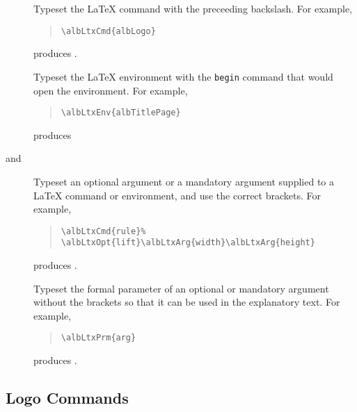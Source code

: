 \documentclass[11pt,a4paper,oneside,titlepage]{alb-latex}
\begin{document}
\begin{description}
\item[] Typeset the \LaTeX{} command
   with the preceeding backslash.  For example,
  \begin{quote}
\begin{verbatim}
\albLtxCmd{albLogo}
\end{verbatim}
  \end{quote}
  produces .

\item[] Typeset the \LaTeX{}
  environment  with the \texttt{begin} command that would
  open the environment.  For example,
  \begin{quote}
\begin{verbatim}
\albLtxEnv{albTitlePage}
\end{verbatim}
  \end{quote}
  produces 

\item[%
   and
  ] Typeset an optional argument  or a mandatory argument
   supplied to a \LaTeX{} command or environment, and use
  the correct brackets.  For example,
  \begin{quote}
\begin{verbatim}
\albLtxCmd{rule}%
\albLtxOpt{lift}\albLtxArg{width}\albLtxArg{height}
\end{verbatim}
  \end{quote}
  produces
  .

\item[] Typeset the formal parameter
  of an optional or mandatory argument without the brackets so that it
  can be used in the explanatory text.  For
  example,
  \begin{quote}
\begin{verbatim}
\albLtxPrm{arg}
\end{verbatim}
  \end{quote}
  produces .
\end{description}



\subsection{Logo Commands}
\label{sec:alb-latex:logo-comm}
\end{document}
